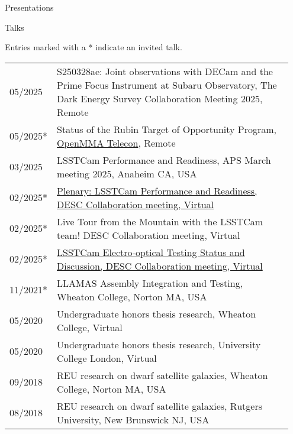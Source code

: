 \documentclass{resume} %
\begin{document}
\begin{rSection}{Presentations}

\begin{rSubsection}{Talks}{}{}{}

Entries marked with a * indicate an invited talk.

    \begin{table}[h]
\begin{tabular}{p{0.07\linewidth} p{0.88\linewidth}}
05/2025 & S250328ae: Joint observations with DECam and the Prime Focus Instrument at Subaru Observatory, The Dark Energy Survey Collaboration Meeting 2025, Remote\\
05/2025* & Status of the Rubin Target of Opportunity Program, \href{https://github.com/scimma/openMMA/wiki/Telecon20250522}{OpenMMA Telecon}, Remote\\
03/2025 & LSSTCam Performance and Readiness, APS March meeting 2025, Anaheim CA, USA\\
02/2025* & \href{https://docs.google.com/presentation/d/18RmTzV5id9RSE4_1xui-RJvK5FeGknrt8Ro1nBn32nk/edit?usp=sharing}{Plenary: LSSTCam Performance and Readiness, DESC Collaboration meeting, Virtual}\\
02/2025* & Live Tour from the Mountain with the LSSTCam team! DESC Collaboration meeting, Virtual\\
02/2025* & \href{https://docs.google.com/presentation/d/12EPsuWSixo40_oqrDPNaXstYnqDzhI_2aFL2hd7IwTE/edit#slide=id.g2ade3bc380_0_0}{LSSTCam Electro-optical Testing Status and Discussion, DESC Collaboration meeting, Virtual}\\
11/2021* & LLAMAS Assembly Integration and Testing, Wheaton College, Norton MA, USA\\
05/2020 & Undergraduate honors thesis research, Wheaton College, Virtual\\ 
05/2020 & Undergraduate honors thesis research, University College London, Virtual\\
09/2018 & REU research on dwarf satellite galaxies, Wheaton College, Norton MA, USA\\
08/2018 & REU research on dwarf satellite galaxies, Rutgers University, New Brunswick NJ, USA\\
\end{tabular}
\end{table}
\end{rSubsection}


\end{rSection}
\end{document}
